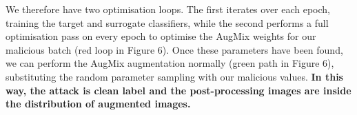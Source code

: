 We therefore have two optimisation loops. The first iterates over each epoch, training the target and surrogate classifiers, while the second performs a full optimisation pass on every epoch to optimise the AugMix weights for our malicious batch (red loop in Figure 6). Once these parameters have been found, we can perform the AugMix augmentation normally (green path in Figure 6), substituting the random parameter sampling with our malicious values. \textbf{In this way, the attack is clean label and the post-processing images are inside the distribution of augmented images.}
